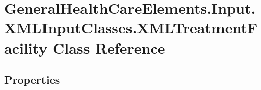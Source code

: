 \hypertarget{class_general_health_care_elements_1_1_input_1_1_x_m_l_input_classes_1_1_x_m_l_treatment_facility}{}\section{General\+Health\+Care\+Elements.\+Input.\+X\+M\+L\+Input\+Classes.\+X\+M\+L\+Treatment\+Facility Class Reference}
\label{class_general_health_care_elements_1_1_input_1_1_x_m_l_input_classes_1_1_x_m_l_treatment_facility}
\subsection*{Properties}

